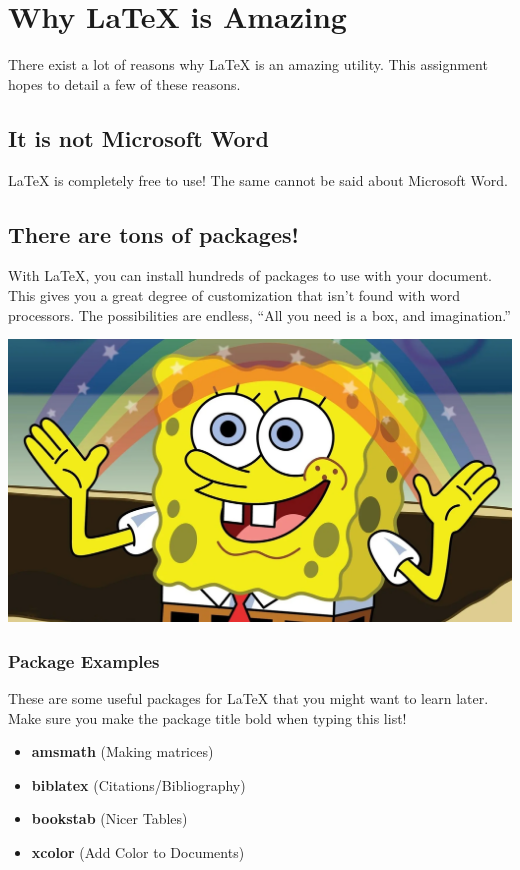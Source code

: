 \section{Why LaTeX is Amazing}
There exist a lot of reasons why LaTeX is an amazing utility. This assignment
hopes to detail a few of these reasons.
\subsection{It is not Microsoft Word}
LaTeX is completely free to use! The same cannot be said about Microsoft
Word.
\subsection{There are tons of packages!}
With LaTeX, you can install hundreds of packages to use with your document.
This gives you a great degree of customization that isn’t found with word processors.
The possibilities are endless, ``All you need is a box, and imagination.''
\begin{center}
    \includegraphics[scale=0.17]{Your-LaTeX-Files/imagination.png}
\end{center}
\subsubsection{Package Examples}
These are some useful packages for LaTeX that you might want to learn later.
Make sure you make the package title bold when typing this list!
\begin{itemize}
\item \textbf{amsmath} (Making matrices)
\item \textbf{biblatex} (Citations/Bibliography)
\item \textbf{bookstab} (Nicer Tables)
\item \textbf{xcolor} (Add Color to Documents)
\end{itemize}
